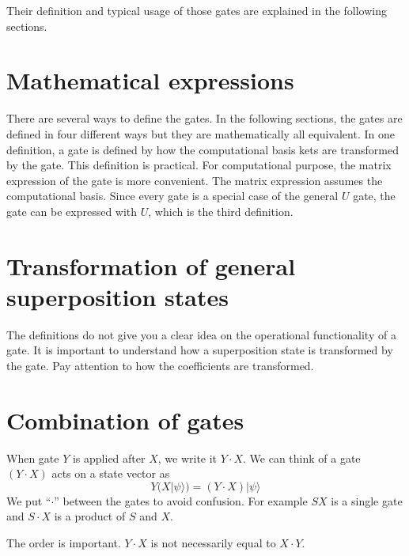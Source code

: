 \documentclass[letterpaper,10pt,english]{jupyterBook}
\begin{document}
\sphinxAtStartPar
Their definition and typical usage of those gates are explained in the following sections.


\section{Mathematical expressions}
\label{\detokenize{q1gates/intro:mathematical-expressions}}
\sphinxAtStartPar
There are several ways to define the gates. In the following sections, the gates are defined in four different ways but they  are mathematically all equivalent.  In one definition, a gate is defined by how the computational basis kets are transformed by the gate.  This definition is practical.  For computational purpose, the matrix expression of the gate is more convenient.  The matrix expression assumes the computational basis. Since every gate is a special case of the general \(U\) gate, the gate can be expressed with \(U\), which is the third definition.


\section{Transformation of general superposition states}
\label{\detokenize{q1gates/intro:transformation-of-general-superposition-states}}
\sphinxAtStartPar
The definitions do not give you a clear idea on the operational functionality of a gate.  It is important to understand how a superposition state is transformed by the gate. Pay attention to how the coefficients are transformed.


\section{Combination of gates}
\label{\detokenize{q1gates/intro:combination-of-gates}}
\sphinxAtStartPar
When gate \(Y\) is applied after \(X\), we write it \(Y \cdot X\). We can think of a gate \((Y \cdot X)\)  acts on a state vector as
\begin{equation*}
Y (X |\psi\rangle) = (Y \cdot X) |\psi\rangle
\end{equation*}
\sphinxAtStartPar
We put “\(\cdot\)” between the gates to avoid confusion.  For example \(SX\) is a single gate and \(S \cdot X\) is a product of \(S\) and \(X\).

\sphinxAtStartPar
The order is important.  \(Y \cdot X\) is not necessarily equal to \(X \cdot Y\).
\end{document}
